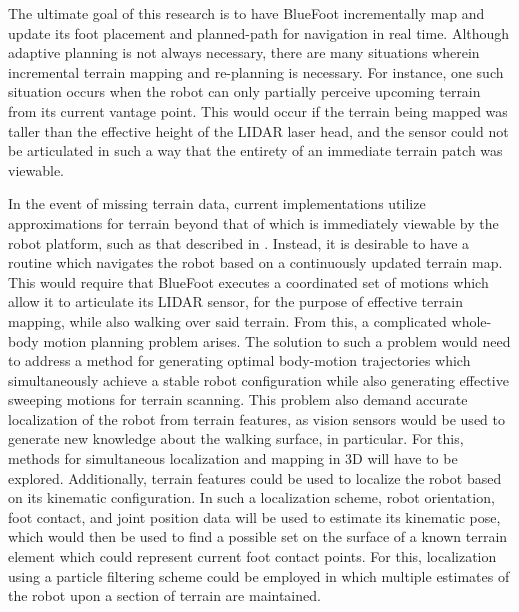 The ultimate goal of this research is to have BlueFoot incrementally map and update its foot placement and planned-path for navigation in real time. Although adaptive planning is not always necessary, there are many situations wherein incremental terrain mapping and re-planning is necessary. For instance, one such situation occurs when the robot can only partially perceive upcoming terrain from its current vantage point. This would occur if the terrain being mapped was taller than the effective height of the LIDAR laser head, and the sensor could not be articulated in such a way that the entirety of an immediate terrain patch was viewable. 

In the event of missing terrain data, current implementations utilize approximations for terrain beyond that of which is immediately viewable by the robot platform, such as that described in \cite{Kolter2009}. Instead, it is desirable to have a routine which navigates the robot based on a continuously updated terrain map. This would require that BlueFoot executes a coordinated set of motions which allow it to articulate its LIDAR sensor, for the purpose of effective terrain mapping, while also walking over said terrain. From this, a complicated whole-body motion planning problem arises. The solution to such a problem would need to address a method for generating optimal body-motion trajectories which simultaneously achieve a stable robot configuration while also generating effective sweeping motions for terrain scanning. This problem also demand accurate localization of the robot from terrain features, as vision sensors would be used to generate new knowledge about the walking surface, in particular. For this, methods for simultaneous localization and mapping in 3D will have to be explored. Additionally, terrain features could be used to localize the robot based on its kinematic configuration. In such a localization scheme, robot orientation, foot contact, and joint position data will be used to estimate its kinematic pose, which would then be used to find a possible set on the surface of a known terrain element which could represent current foot contact points. For this, localization using a particle filtering scheme could be employed in which multiple estimates of the robot upon a section of terrain are maintained.
